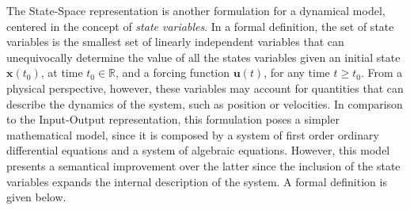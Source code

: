 \documentclass[a4paper,11pt]{book}
\numberwithin{figure}{chapter}
\numberwithin{equation}{chapter}
\numberwithin{table}{chapter}
\theoremstyle{definition}
\begin{document}
The State-Space representation is another formulation for a dynamical model, centered in the concept of \textit{state variables}. In a formal definition, the set of state variables is the smallest set of linearly independent variables that can unequivocally determine the value of all the states variables given an initial state $\bm{x}(t_0)$, at time $t_0 \in \mathbb{R}$, and a forcing function $\bm{u}(t)$, for any time $t \geq t_0$. From a physical perspective, however, these variables may account for quantities that can describe the dynamics of the system, such as position or velocities. In comparison to the Input-Output representation, this formulation poses a simpler mathematical model, since it is composed by a system of first order ordinary differential equations and a system of algebraic equations. However, this model presents a semantical improvement over the latter since the inclusion of the state variables expands the internal description of the system. A formal definition is given below.
\end{document}
